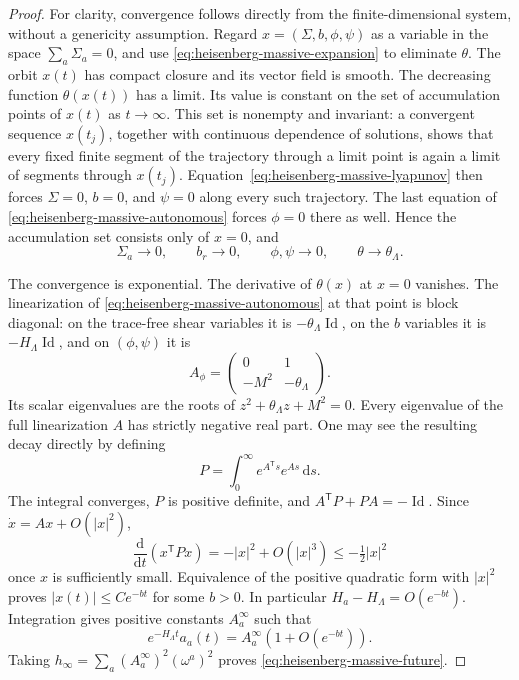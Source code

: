 \documentclass[10pt,a4paper]{article}
\numberwithin{equation}{section}
\theoremstyle{definition}
\theoremstyle{remark}
\newcommand{\dd}{\mathrm d}
\begin{document}
\begin{proof}
For clarity, convergence follows directly from the finite-dimensional
system, without a genericity assumption.  Regard
$x=(\Sigma,b,\phi,\psi)$ as a variable in the space
$\sum_a\Sigma_a=0$, and use
\eqref{eq:heisenberg-massive-expansion} to eliminate $\theta$.
The orbit $x(t)$ has compact closure and its vector field is smooth.
The decreasing function $\theta(x(t))$ has a limit.  Its value is
constant on the set of accumulation points of $x(t)$ as
$t\to\infty$.  This set is nonempty and invariant: a convergent
sequence $x(t_j)$, together with continuous dependence of solutions,
shows that every fixed finite segment of the trajectory through a
limit point is again a limit of segments through $x(t_j)$.
Equation~\eqref{eq:heisenberg-massive-lyapunov} then forces
$\Sigma=0$, $b=0$, and $\psi=0$ along every such trajectory.
The last equation of \eqref{eq:heisenberg-massive-autonomous}
forces $\phi=0$ there as well.  Hence the accumulation set consists
only of $x=0$, and
\[
 \Sigma_a\longrightarrow0,\qquad b_r\longrightarrow0,
 \qquad \phi,\psi\longrightarrow0,
 \qquad \theta\longrightarrow\theta_\Lambda.
\]

The convergence is exponential.  The derivative of
$\theta(x)$ at $x=0$ vanishes.  The linearization of
\eqref{eq:heisenberg-massive-autonomous} at that point is block
diagonal: on the trace-free shear variables it is
$-\theta_\Lambda\operatorname{Id}$, on the $b$ variables it is
$-H_\Lambda\operatorname{Id}$, and on $(\phi,\psi)$ it is
\[
 A_\phi=\begin{pmatrix}0&1\\-M^2&-\theta_\Lambda\end{pmatrix}.
\]
Its scalar eigenvalues are the roots of
$z^2+\theta_\Lambda z+M^2=0$.  Every eigenvalue of the full
linearization $A$ has strictly negative real part.
One may see the resulting decay directly by defining
\[
 P=\int_0^\infty e^{A^{\mathsf T}s}e^{As}\,\dd s.
\]
The integral converges, $P$ is positive definite, and
$A^{\mathsf T}P+PA=-\operatorname{Id}$.
Since $\dot x=Ax+O(|x|^2)$,
\[
 \frac{\dd}{\dd t}(x^{\mathsf T}Px)
   =-|x|^2+O(|x|^3)\le-\tfrac12|x|^2
\]
once $x$ is sufficiently small.  Equivalence of the positive
quadratic form with $|x|^2$ proves $|x(t)|\le Ce^{-bt}$ for some
$b>0$.  In particular $H_a-H_\Lambda=O(e^{-bt})$.
Integration gives positive constants $A_a^\infty$ such that
\[
 e^{-H_\Lambda t}a_a(t)
       =A_a^\infty(1+O(e^{-bt})).
\]
Taking $h_\infty=\sum_a(A_a^\infty)^2(\omega^a)^2$ proves
\eqref{eq:heisenberg-massive-future}.


\end{proof}
\end{document}
